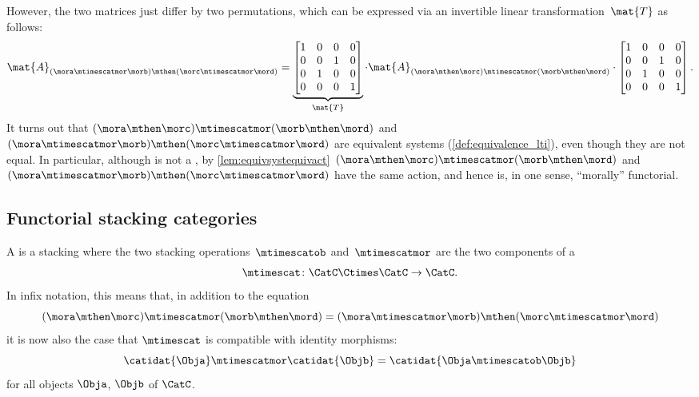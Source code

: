 \begin{example}
    However, the two matrices just differ by two permutations, which can be expressed via an invertible linear transformation~$\mat{T}$ as follows:
    \begin{equation}
        \mat{A}_{(\mora\mtimescatmor \morb)\mthen (\morc\mtimescatmor \mord)}=
        \underbrace{\begin{bmatrix}
                1 & 0 & 0 & 0 \\
                0 & 0 & 1 & 0 \\
                0 & 1 & 0 & 0 \\
                0 & 0 & 0 & 1
            \end{bmatrix}}_{\mat{T}}\cdot
        \mat{A}_{(\mora \mthen \morc)\mtimescatmor (\morb\mthen \mord)}
        \cdot
        \begin{bmatrix}
            1 & 0 & 0 & 0 \\
            0 & 0 & 1 & 0 \\
            0 & 1 & 0 & 0 \\
            0 & 0 & 0 & 1
        \end{bmatrix}.
    \end{equation}
    It turns out that $(\mora \mthen \morc)\mtimescatmor (\morb\mthen \mord)$ and~$(\mora\mtimescatmor \morb)\mthen (\morc\mtimescatmor \mord)$ are equivalent systems (\cref{def:equivalence_lti}), even though they are not equal.
    In particular, although \LTI is not a , by \cref{lem:equivsystequivact}~$(\mora \mthen \morc)\mtimescatmor (\morb\mthen \mord)$ and~$(\mora\mtimescatmor \morb)\mthen (\morc\mtimescatmor \mord)$ have the same action, and hence \LTI is, in one sense, ``morally'' functorial.
\end{example}

\subsection{Functorial stacking categories}

\begin{ctdefinition}
    \label{def:functorial-stacking-cat}
    A  is a stacking  where the two stacking operations~$\mtimescatob$ and~$\mtimescatmor$ are the two components of a  \begin{equation}
        \mtimescat\colon \CatC \Ctimes \CatC \to \CatC.
    \end{equation}
    In infix notation, this means that, in addition to the equation
    \begin{equation}
        (\mora \mthen \morc )
        \mtimescatmor (\morb \mthen \mord )
        =
        (\mora \mtimescatmor \morb )
        \mthen (\morc \mtimescatmor \mord )
    \end{equation}
    it is now also the case that $\mtimescat$ is compatible with identity morphisms:
    \begin{equation}
        \catidat{\Obja} \mtimescatmor \catidat{\Objb} = \catidat{\Obja \mtimescatob \Objb}
    \end{equation}
    for all objects $\Obja$, $\Objb$ of $\CatC$.
\end{ctdefinition}

